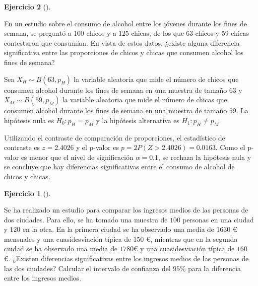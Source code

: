 \documentclass[
  a4paper,
]{scrreport}
\theoremstyle{definition}
\newtheorem{exercise}{Ejercicio}[chapter]
\theoremstyle{remark}
\begin{document}
\begin{exercise}[]\protect\hypertarget{exr-contraste-proporcion-consumo-alcohol}{}\label{exr-contraste-proporcion-consumo-alcohol}

En un estudio sobre el consumo de alcohol entre los jóvenes durante los
fines de semana, se preguntó a 100 chicos y a 125 chicas, de los que 63
chicos y 59 chicas contestaron que consumían. En vista de estos datos,
¿existe alguna diferencia significativa entre las proporciones de chicos
y chicas que consumen alcohol los fines de semana?

\begin{tcolorbox}[enhanced jigsaw, colbacktitle=quarto-callout-tip-color!10!white, bottomrule=.15mm, bottomtitle=1mm, rightrule=.15mm, colback=white, left=2mm, opacityback=0, title=\textcolor{quarto-callout-tip-color}{\faLightbulb}\hspace{0.5em}{Solución}, leftrule=.75mm, arc=.35mm, titlerule=0mm, coltitle=black, opacitybacktitle=0.6, colframe=quarto-callout-tip-color-frame, breakable, toprule=.15mm, toptitle=1mm]

Sea \(X_H\sim B(63,p_H)\) la variable aleatoria que mide el número de
chicos que consumen alcohol durante los fines de semana en una muestra
de tamaño \(63\) y \(X_M\sim B(59,p_M)\) la variable aleatoria que mide
el número de chicas que consumen alcohol durante los fines de semana en
una muestra de tamaño \(59\). La hipótesis nula es \(H_0: p_H=p_M\) y la
hipótesis alternativa es \(H_1: p_H\neq p_M\).

Utilizando el contraste de comparación de proporciones, el estadístico
de contraste es \(z=2.4026\) y el p-valor es
\(p =2 P(Z>2.4026) = 0.0163\). Como el p-valor es menor que el nivel de
significación \(\alpha = 0.1\), se rechaza la hipótesis nula y se
concluye que hay diferencias significativas entre el consumo de alcohol
de chicos y chicas.

\end{tcolorbox}

\begin{exercise}[]\protect\hypertarget{exr-contraste-medias-ingresos}{}\label{exr-contraste-medias-ingresos}

Se ha realizado un estudio para comparar los ingresos medios de las
personas de dos ciudades. Para ello, se ha tomado una muestra de \(100\)
personas en una ciudad y \(120\) en la otra. En la primera ciudad se ha
observado una media de \(1630\) € mensuales y una cuasidesviación típica
de \(150\) €, mientras que en la segunda ciudad se ha observado una
media de \(1780\)€ y una cuasidesviación típica de \(160\) €. ¿Existen
diferencias significativas entre los ingresos medios de las personas de
las dos ciudades? Calcular el intervalo de confianza del \(95\)\% para
la diferencia entre los ingresos medios.


\end{exercise}
\end{exercise}
\end{document}
